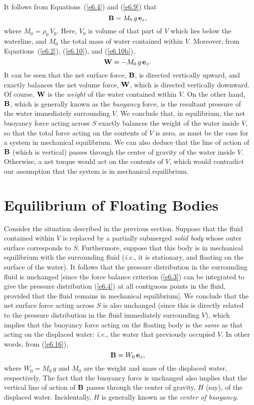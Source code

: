 It follows from Equations~(\ref{e6.4}) and (\ref{e6.9}) that 
\begin{equation}\label{e6.16}
{\bf B}  = M_0\,g\,{\bf e}_z,
\end{equation}
where 
$M_0 = \rho_0\,V_0$.
Here, $V_0$ is volume of that part of $V$ which lies below the waterline, and $M_0$  the
total mass of water contained within $V$. 
 Moreover, from Equations~(\ref{e6.2}), (\ref{e6.10}), and (\ref{e6.10b}),
\begin{equation}
{\bf W} = -M_0\,g\,{\bf e}_z.
\end{equation}
It can be seen that the net surface force, ${\bf B}$, is directed vertically upward, and exactly balances the
net volume force, ${\bf W}$, which is directed vertically downward. Of course, ${\bf W}$ is the {\em weight}\/ of the water contained
within $V$. On the other hand,  ${\bf B}$,  which is generally known as the {\em buoyancy}\/ force,
is the resultant pressure of the water immediately surrounding $V$.  We conclude that, in  equilibrium,   the net buoyancy force acting across $S$ exactly balances the weight of the water inside $V$, so that the total force acting on the contents of $V$ is zero, as
must be the case for a system in mechanical equilibrium. We can  also deduce that 
the line of action of ${\bf B}$ (which is vertical) passes through the  center of gravity of the water inside $V$.  Otherwise, a  net torque would act on the contents of $V$, which would contradict our  assumption that the system is in 
mechanical equilibrium.

\section{Equilibrium of Floating Bodies}\label{s6.4}
Consider the situation described in the previous section.
Suppose that the fluid contained within  $V$ is replaced by a partially submerged {\em solid body}\/ whose outer surface
corresponds to $S$. Furthermore, suppose that this body is in mechanical equilibrium with the surrounding fluid ({\em i.e.}, it is stationary, and floating on the surface of the water). 
It follows that the pressure distribution in the surrounding fluid is unchanged [since the force balance criterion (\ref{e6.3}) can be integrated to give the pressure distribution (\ref{e6.4}) at all contiguous points in the fluid, provided that the fluid remains 
in mechanical equilibrium]. 
We conclude that the net surface force acting across  $S$ is also unchanged (since this is directly related to the
pressure distribution in the fluid immediately surrounding $V$), which implies that the 
buoyancy force acting on the
floating body is the {\em same}\/ as that acting on the displaced water: {\em i.e.}, the water that previously
occupied $V$. 
In other words, from (\ref{e6.16}), 
\begin{equation}
{\bf B} = W_0\,{\bf e}_z,
\end{equation}
where $W_0=M_0\,g$ and $M_0$ are the weight and mass of the displaced water, respectively.  The fact that the
buoyancy force is unchanged also implies that the vertical line of action of ${\bf B}$ passes through the center of gravity, $H$ (say), of the displaced water. Incidentally, $H$ is generally
known as the {\em center of buoyancy}. 

